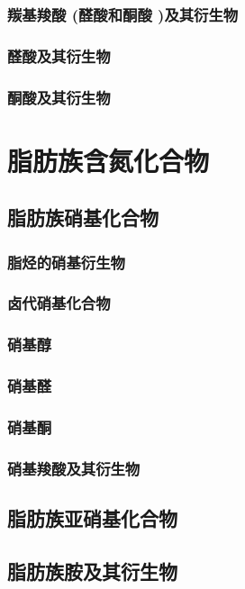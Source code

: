 \documentclass[UTF8]{../03-Chemistry}
\begin{document}
    \subsubsection{羰基羧酸 (醛酸和酮酸 )及其衍生物}
        \subsubsection{醛酸及其衍生物}
        \subsubsection{酮酸及其衍生物}

\section{脂肪族含氮化合物}
    \subsection{脂肪族硝基化合物}
        \subsubsection{脂烃的硝基衍生物}
        \subsubsection{卤代硝基化合物}
        \subsubsection{硝基醇}
        \subsubsection{硝基醛}
        \subsubsection{硝基酮}
        \subsubsection{硝基羧酸及其衍生物}
    \subsection{脂肪族亚硝基化合物}
    \subsection{脂肪族胺及其衍生物}
\end{document}
